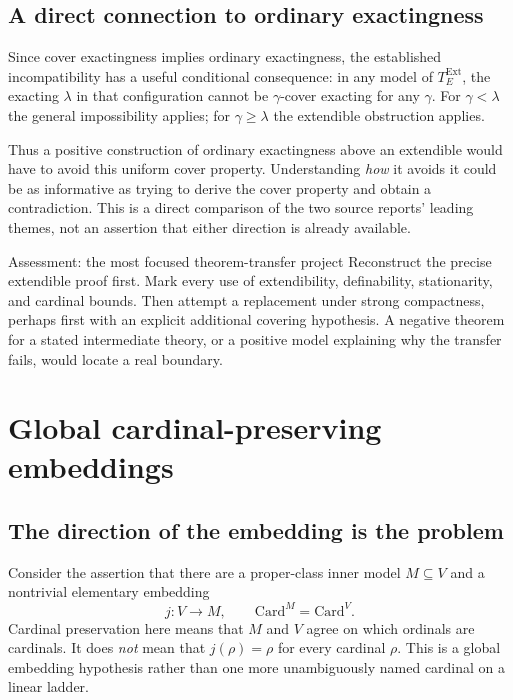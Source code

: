 \documentclass[11pt,letterpaper]{article}
\theoremstyle{definition}
\newcommand{\Card}{\mathrm{Card}}
\begin{document}
\subsection{A direct connection to ordinary exactingness}

Since cover exactingness implies ordinary exactingness, the established incompatibility has a useful conditional consequence: in any model of $T_E^{\mathrm{Ext}}$, the exacting $\lambda$ in that configuration cannot be $\gamma$-cover exacting for any $\gamma$. For $\gamma<\lambda$ the general impossibility applies; for $\gamma\geq\lambda$ the extendible obstruction applies.

Thus a positive construction of ordinary exactingness above an extendible would have to avoid this uniform cover property. Understanding \emph{how} it avoids it could be as informative as trying to derive the cover property and obtain a contradiction. This is a direct comparison of the two source reports' leading themes, not an assertion that either direction is already available.

\begin{assessment}{Assessment: the most focused theorem-transfer project}
Reconstruct the precise extendible proof first. Mark every use of extendibility, definability, stationarity, and cardinal bounds. Then attempt a replacement under strong compactness, perhaps first with an explicit additional covering hypothesis. A negative theorem for a stated intermediate theory, or a positive model explaining why the transfer fails, would locate a real boundary.
\end{assessment}

\section{Global cardinal-preserving embeddings}\label{sec:cp}

\subsection{The direction of the embedding is the problem}

Consider the assertion that there are a proper-class inner model $M\subseteq V$ and a nontrivial elementary embedding
\begin{equation}
 j:V\longrightarrow M,
 \qquad \Card^M=\Card^V.
 \label{eq:cp}
\end{equation}
Cardinal preservation here means that $M$ and $V$ agree on which ordinals are cardinals. It does \emph{not} mean that $j(\rho)=\rho$ for every cardinal $\rho$. This is a global embedding hypothesis rather than one more unambiguously named cardinal on a linear ladder.
\end{document}

